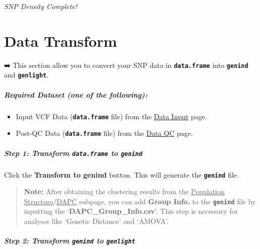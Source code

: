 \documentclass[
]{book}
\begin{document}
\emph{SNP Density Complete!}

\chapter{Data Transform}\label{sec-data-conversion}

➡️ This section allow you to convert your SNP data in {\textbf{\texttt{data.frame}}} into {\textbf{\texttt{genind}}} and {\textbf{\texttt{genlight}}}.

\paragraph*{Required Dataset (one of the following):}\label{required-dataset-one-of-the-following-4}

\begin{itemize}
\item
  Input VCF Data ({\textbf{\texttt{data.frame}}} file) from the \ul{Data Input} page.
\item
  Post-QC Data ({\textbf{\texttt{data.frame}}} file) from the \ul{Data QC} page.
\end{itemize}

\paragraph*{\texorpdfstring{Step 1: Transform {\textbf{\texttt{data.frame}}} to {\textbf{\texttt{genind}}}}{Step 1: Transform data.frame to genind}}\label{step-1-transform-data.frame-to-genind}

Click the {\textbf{Transform to genind}} button. This will generate the {\textbf{\texttt{genind}}} file.

\begin{quote}
\textbf{Note:} After obtaining the clustering results from the \ul{Population Structure}/\ul{DAPC} subpage, you can add \textbf{Group Info.} to the {\textbf{\texttt{genind}}} file by inputting the `\textbf{DAPC\_Group\_Info.csv}'. This step is necessary for analyses like `Genetic Distance' and `AMOVA'.
\end{quote}

\paragraph*{\texorpdfstring{Step 2: Transform {\textbf{\texttt{genind}}} to {\textbf{\texttt{genlight}}}}{Step 2: Transform genind to genlight}}\label{step-2-transform-genind-to-genlight}
\end{document}
